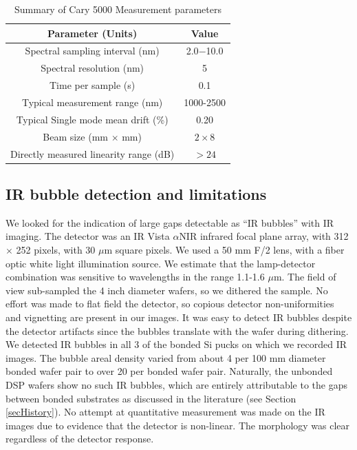 \documentclass[osajnl,preprint,showpacs,superscriptaddress,12pt]{revtex4-1} %
\begin{document}
\begin{table}[h!]
\caption{Summary of Cary 5000 Measurement parameters \label{tab:Cary5000pars}}
\begin{center}
\begin{tabular}{ c c }
\hline
        Parameter (Units) & Value \\ 
\hline
        Spectral sampling interval (nm) & 2.0$-$10.0 \\
        Spectral resolution (nm) & 5 \\
        Time per sample (s) & 0.1 \\
        Typical measurement range (nm) & 1000-2500 \\
	Typical Single mode mean drift (\%) & 0.20 \\
 	Beam size (mm $\times$ mm) & $2 \times 8$ \\
        Directly measured linearity range (dB) & $>24$ \\
    \hline
    \end{tabular}
\end{center}
\end{table}


\subsection{IR bubble detection and limitations}

We looked for the indication of large gaps detectable as ``IR bubbles'' \cite{1992JEMat..21..669M} with IR imaging.  The detector was an IR Vista $\alpha$NIR infrared focal plane array, with 312 $\times$ 252 pixels, with 30 $\mu$m square pixels.  We used a 50 mm F/2 lens, with a fiber optic white light illumination source.  We estimate that the lamp-detector combination was sensitive to wavelengths in the range 1.1-1.6 $\mu$m.  The field of view sub-sampled the 4 inch diameter wafers, so we dithered the sample.  No effort was made to flat field the detector, so copious detector non-uniformities and vignetting are present in our images.  It was easy to detect IR bubbles despite the detector artifacts since the bubbles translate with the wafer during dithering.  We detected IR bubbles in all 3 of the bonded Si pucks on which we recorded IR images.  The bubble areal density varied from about 4 per 100 mm diameter bonded wafer pair to over 20 per bonded wafer pair.  Naturally, the unbonded DSP wafers show no such IR bubbles, which are entirely attributable to the gaps between bonded substrates as discussed in the literature (see Section \ref{secHistory}).  No attempt at quantitative measurement was made on the IR images due to evidence that the detector is non-linear.  The morphology was clear regardless of the detector response.  
\end{document}
